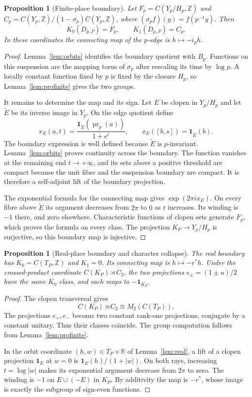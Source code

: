 \documentclass[11pt]{article}
\newcommand{\Z}{\mathbb Z}
\newcommand{\R}{\mathbb R}
\newcommand{\one}{\mathbf 1}
\newtheorem{proposition}[theorem]{Proposition}
\theoremstyle{definition}
\theoremstyle{remark}
\begin{document}
\begin{proposition}[Finite-place boundary]\label{prop:finiteboundary}
Let $F_p=C(Y_p/H_p,\Z)$ and $C_p=C(Y_p,\Z)/(1-\sigma_p)C(Y_p,\Z)$, where $(\sigma_pf)(y)=f(p^{-1}y)$. Then
\[
 K_0(D_{p,P})=F_p,\qquad K_1(D_{p,P})=C_p.
\]
In these coordinates the connecting map of the $p$-edge is $h\mapsto-i_ph$.
\end{proposition}
\begin{proof}
Lemma~\ref{lem:orbits} identifies the boundary quotient with $B_p$. Functions on this suspension are the mapping torus of $\sigma_p$ after rescaling its time by $\log p$. A locally constant function fixed by $p$ is fixed by the closure $H_p$, so Lemma~\ref{lem:profinite} gives the two groups.

It remains to determine the map and its sign. Let $E$ be clopen in $Y_p/H_p$ and let $\widetilde E$ be its inverse image in $Y_p$. On the edge quotient define
\[
 x_E(a,t)=\frac{\one_{\widetilde E}(\operatorname{pr}_p(a))}{1+e^t},
 \qquad x_E([b,s])=\one_{\widetilde E}(b).
\]
The boundary expression is well defined because $\widetilde E$ is $p$-invariant. Lemma~\ref{lem:orbits} proves continuity across the boundary. The function vanishes at the remaining end $t\to+\infty$, and its sets above a positive threshold are compact because the unit fibre and the suspension boundary are compact. It is therefore a self-adjoint lift of the boundary projection.

The exponential formula for the connecting map \citep[\S9.3.2, p.~68]{Blackadar} gives $\exp(2\pi ix_E)$. On every fibre above $\widetilde E$ its argument decreases from $2\pi$ to $0$ as $t$ increases. Its winding is $-1$ there, and zero elsewhere. Characteristic functions of clopen sets generate $F_p$, which proves the formula on every class. The projection $K_P\to Y_p/H_p$ is surjective, so this boundary map is injective.
\end{proof}

\begin{proposition}[Real-place boundary and character collapse]\label{prop:realboundary}
The real boundary has $K_0=C(T_P,\Z)$ and $K_1=0$. Its connecting map is $h\mapsto-r^*h$. Under the crossed-product coordinate $C(K_P)\rtimes C_2$, the two projections $e_\pm=(1\pm u)/2$ have the same $K_0$ class, and each maps to $-\one_{K_P}$.
\end{proposition}
\begin{proof}
The clopen transversal gives
\[
 C(K_P)\rtimes C_2\cong M_2(C(T_P)).
\]
The projections $e_+,e_-$ become two constant rank-one projections, conjugate by a constant unitary. Thus their classes coincide. The group computation follows from Lemma~\ref{lem:profinite}.

In the orbit coordinate $(h,w)\in T_P\times\R$ of Lemma~\ref{lem:real}, a lift of a clopen projection $\one_E$ at $w=0$ is $\one_E(h)/(1+|w|)$. On both rays, increasing $t=\log|w|$ makes its exponential argument decrease from $2\pi$ to zero. The winding is $-1$ on $E\cup(-E)$ in $K_P$. By additivity the map is $-r^*$, whose image is exactly the subgroup of sign-even functions.
\end{proof}
\end{document}
